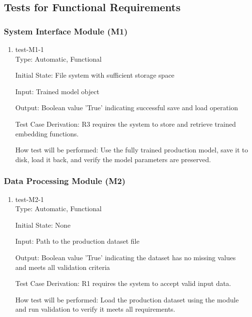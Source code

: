 \documentclass[12pt, titlepage]{article}
\begin{document}
\subsection{Tests for Functional Requirements}

\subsubsection{System Interface Module (M1)}

\begin{enumerate}

  \item{test-M1-1\\}
Type: Automatic, Functional
					
Initial State: File system with sufficient storage space

Input: Trained model object
					
Output: Boolean value 'True' indicating successful save and load operation

Test Case Derivation: R3 requires the system to store and retrieve trained embedding functions.

How test will be performed: Use the fully trained production model, save it to disk, load it back, and verify the model parameters are preserved.


\end{enumerate}

\subsubsection{Data Processing Module (M2)}

\begin{enumerate}
  \item{test-M2-1\\}
  Type: Automatic, Functional
            
  Initial State: None
            
  Input: Path to the production dataset file
            
  Output: Boolean value 'True' indicating the dataset has no missing values and meets all validation criteria
  
  Test Case Derivation: R1 requires the system to accept valid input data.
  
  How test will be performed: Load the production dataset using the module and run validation to verify it meets all requirements.
  
\end{enumerate}
\end{document}
